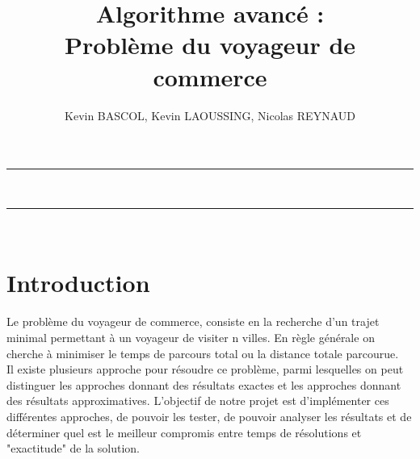 \documentclass[10pt,a4paper]{report}
\author{Kevin BASCOL, Kevin LAOUSSING, Nicolas REYNAUD}
\title{Algorithme avancé : \\Problème du voyageur de commerce}
\begin{document}
\makeatletter
	\begin{titlepage}
	
	\begin{figure}
		\begin{minipage}[c]{.46\linewidth}
		\end{minipage} \hfill
		\begin{minipage}[c]{.20\linewidth}

		\end{minipage}
	\vspace{1cm}
	\end{figure}
	
	\centering
		{
		\hrule height 2pt
		\vspace{0.7cm}
		\Huge \textbf{\@title}}\\
		\vspace{0.7cm}
		\hrule height 2pt
		
		\vfill
		\vspace{1cm}
		\@author\\
		\end{titlepage}
\makeatother
\setcounter{secnumdepth}{5}
\setcounter{tocdepth}{5}
\renewcommand{\contentsname}{Sommaire}
\begingroup\makeatletter
\def\@makeschapterhead#1{%
  {\parindent \z@ \raggedright
    \normalfont
    \interlinepenalty\@M
    \Huge \bfseries  #1\par\nobreak
    \vskip 20pt%
  }}\makeatother
\tableofcontents
\endgroup
\thispagestyle{empty}
\setcounter{page}{0}
\newpage


\section{Introduction}
\begin{flushleft}
Le problème du voyageur de commerce, consiste en la recherche d'un trajet minimal permettant à un voyageur de visiter n villes. En règle générale on cherche à minimiser le temps de parcours total ou la distance totale parcourue.\\
Il existe plusieurs approche pour résoudre ce problème, parmi lesquelles on peut distinguer les approches donnant des résultats exactes et les approches donnant des résultats approximatives.
L'objectif de notre projet est d'implémenter ces différentes approches, de pouvoir les tester, de pouvoir analyser les résultats et de déterminer quel est le meilleur compromis entre temps de résolutions et "exactitude" de la solution.
\end{flushleft}
\end{document}
